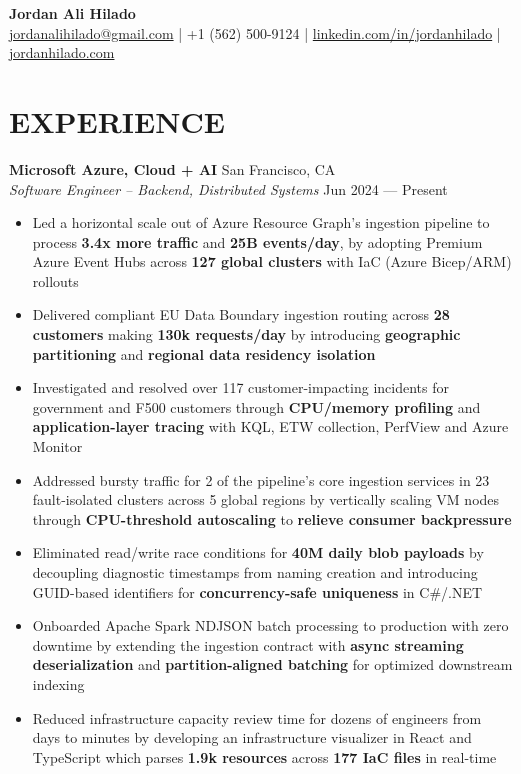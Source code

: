 \documentclass[letterpaper,10pt]{extarticle}
\begin{document}
\normalsize
\raggedright
\pagestyle{empty}

\begin{center}
\textbf{\Large Jordan Ali Hilado}\\[2pt]
\href{mailto:jordanalihilado@gmail.com}{jordanalihilado@gmail.com} | +1 (562) 500-9124 | \href{https://www.linkedin.com/in/jordanhilado}{linkedin.com/in/jordanhilado} | \href{https://jordanhilado.com/}{jordanhilado.com}
\end{center}

\section*{EXPERIENCE}

\noindent
\textbf{Microsoft Azure, Cloud + AI} \hfill San Francisco, CA \\
\textit{Software Engineer -- Backend, Distributed Systems} \hfill Jun 2024 --- Present
\begin{itemize}
    \item Led a horizontal scale out of Azure Resource Graph's ingestion pipeline to process \textbf{3.4x more traffic} and \textbf{25B events/day}, by adopting Premium Azure Event Hubs across \textbf{127 global clusters} with IaC (Azure Bicep/ARM) rollouts
    \item Delivered compliant EU Data Boundary ingestion routing across \textbf{28 customers} making \textbf{130k requests/day} by introducing \textbf{geographic partitioning} and \textbf{regional data residency isolation}
    \item Investigated and resolved over 117 customer-impacting incidents for government and F500 customers through \textbf{CPU/memory profiling} and \textbf{application-layer tracing} with KQL, ETW collection, PerfView and Azure Monitor
    \item Addressed bursty traffic for 2 of the pipeline's core ingestion services in 23 fault-isolated clusters across 5 global regions by vertically scaling VM nodes through \textbf{CPU-threshold autoscaling} to \textbf{relieve consumer backpressure}
    \item Eliminated read/write race conditions for \textbf{40M daily blob payloads} by decoupling diagnostic timestamps from naming creation and introducing GUID-based identifiers for \textbf{concurrency-safe uniqueness} in C\#/.NET
    \item Onboarded Apache Spark NDJSON batch processing to production with zero downtime by extending the ingestion contract with \textbf{async streaming deserialization} and \textbf{partition-aligned batching} for optimized downstream indexing
    \item Reduced infrastructure capacity review time for dozens of engineers from days to minutes by developing an infrastructure visualizer in React and TypeScript which parses \textbf{1.9k resources} across \textbf{177 IaC files} in real-time
\end{itemize}
\end{document}
